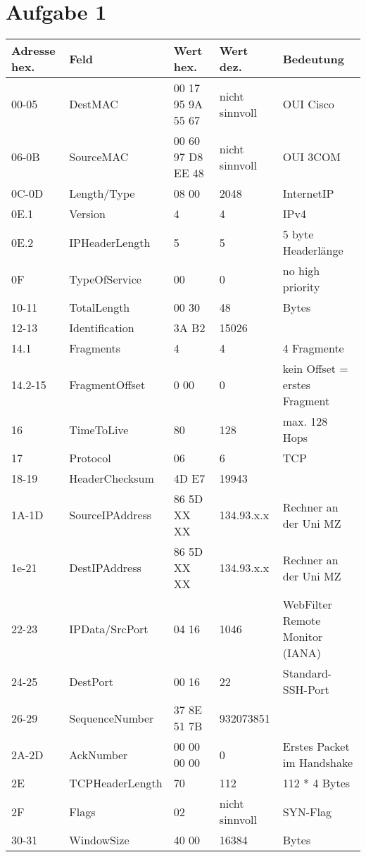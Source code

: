 \section{Aufgabe 1}

\begin{tabular}{|l|l|l|l|l|}\hline
Adresse hex. & Feld & Wert hex. & Wert dez. & Bedeutung \\\hline\hline
00-05 & DestMAC & 00 17 95 9A 55 67 & nicht sinnvoll & OUI Cisco \\\hline
06-0B & SourceMAC & 00 60 97 D8 EE 48 & nicht sinnvoll & OUI 3COM \\\hline
0C-0D & Length/Type & 08 00 & 2048 & InternetIP \\\hline\hline
0E.1 & Version & 4 & 4 & IPv4 \\\hline
0E.2 & IPHeaderLength & 5 & 5 & 5 byte Headerlänge \\\hline
0F & TypeOfService & 00 & 0 & no high priority\\\hline
10-11 & TotalLength & 00 30 & 48 & Bytes \\\hline
12-13 & Identification & 3A B2 & 15026 & \\\hline
14.1 & Fragments & 4 & 4 & 4 Fragmente \\\hline
14.2-15 & FragmentOffset & 0 00 & 0 & kein Offset = erstes Fragment\\\hline
16 & TimeToLive & 80 & 128 & max. 128 Hops \\\hline
17 & Protocol & 06 & 6 & TCP \\\hline
18-19 & HeaderChecksum & 4D E7 & 19943 & \\\hline
1A-1D & SourceIPAddress & 86 5D XX XX & 134.93.x.x & Rechner an der Uni MZ \\\hline
1e-21 & DestIPAddress & 86 5D XX XX & 134.93.x.x & Rechner an der Uni MZ \\\hline\hline
22-23 & IPData/SrcPort & 04 16 & 1046 & WebFilter Remote Monitor (IANA) \\\hline
24-25 & DestPort & 00 16 & 22 & Standard-SSH-Port \\\hline
26-29 & SequenceNumber & 37 8E 51 7B & 932073851 & \\\hline
2A-2D & AckNumber & 00 00 00 00 & 0 & Erstes Packet im Handshake \\\hline
2E & TCPHeaderLength & 70 & 112 & 112 * 4 Bytes\\\hline
2F & Flags & 02 & nicht sinnvoll & SYN-Flag \\\hline
30-31 & WindowSize & 40 00 & 16384 & Bytes \\\hline

\end{tabular}
